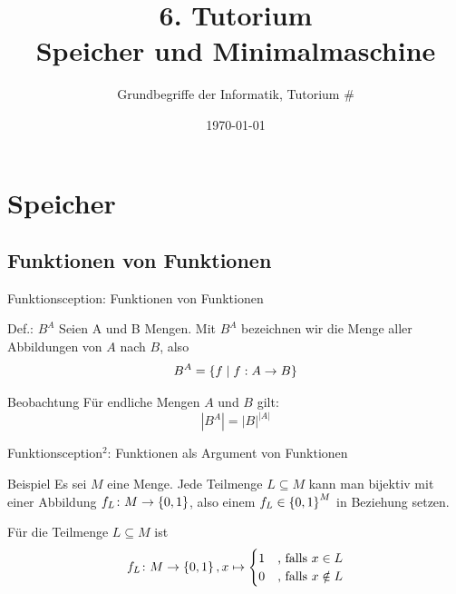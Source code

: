 



\title[Speicher und Minimalmaschine]{6. Tutorium\\ Speicher und Minimalmaschine}
\subtitle{Grundbegriffe der Informatik, Tutorium \#\mytutnumber}
\date{\today}


\titleframe
\roadmap

\section{Speicher}
\subsection{Funktionen von Funktionen}

\begin{frame}{Funktionsception: Funktionen von Funktionen}
	\begin{block}{Def.: $B^A$}
		Seien A und B Mengen. Mit $B^A$ bezeichnen wir die Menge aller Abbildungen von $A$ nach $B$, also $$B^A = \left\{ f \mid f : A \to B  \right\}$$
	\end{block}

	\begin{block}{Beobachtung}
		Für endliche Mengen $A$ und $B$ gilt:
		$$|B^A| = |B|^{|A|}$$
	\end{block}
\end{frame}

\begin{frame}{Funktionsception${}^2$: Funktionen als Argument von Funktionen}

	\begin{exampleblock}{Beispiel}
		\small Es sei $M$ eine Menge. Jede Teilmenge $L \subseteq M$ kann man bijektiv mit einer Abbildung $f_L \colon M \to \left\{ 0,1 \right\}$, also einem $f_L \in \left\{ 0,1 \right\}^M$ in Beziehung setzen.

		Für die Teilmenge $L \subseteq M$ ist 
		\begin{equation*} 
			f_L \colon M \to \left\{ 0,1 \right\}, x \mapsto
			\begin{cases}
				1 & \text{, falls } x \in L \\
				0 & \text{, falls } x \notin L
			\end{cases}
		\end{equation*}
	\end{exampleblock}
\end{frame}

